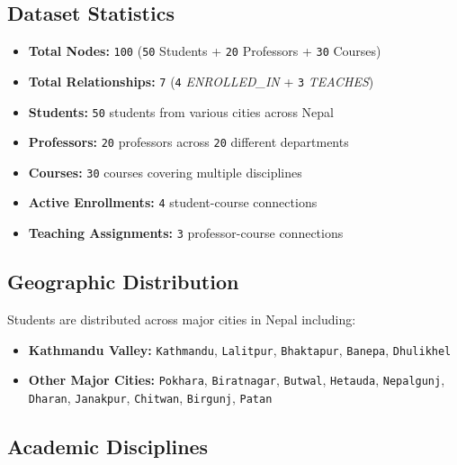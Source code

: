 \subsection{Dataset Statistics}

\begin{itemize}
    \item \textbf{Total Nodes:} \texttt{100} (\texttt{50} Students + \texttt{20} Professors + \texttt{30} Courses)
    \item \textbf{Total Relationships:} \texttt{7} (\texttt{4} \textit{ENROLLED\_IN} + \texttt{3} \textit{TEACHES})
    \item \textbf{Students:} \texttt{50} students from various cities across Nepal
    \item \textbf{Professors:} \texttt{20} professors across \texttt{20} different departments
    \item \textbf{Courses:} \texttt{30} courses covering multiple disciplines
    \item \textbf{Active Enrollments:} \texttt{4} student-course connections
    \item \textbf{Teaching Assignments:} \texttt{3} professor-course connections
\end{itemize}

\subsection{Geographic Distribution}

Students are distributed across major cities in Nepal including:
\begin{itemize}
    \item \textbf{Kathmandu Valley:} \texttt{Kathmandu}, \texttt{Lalitpur}, \texttt{Bhaktapur}, \texttt{Banepa}, \texttt{Dhulikhel}
    \item \textbf{Other Major Cities:} \texttt{Pokhara}, \texttt{Biratnagar}, \texttt{Butwal}, \texttt{Hetauda}, \texttt{Nepalgunj}, \texttt{Dharan}, \texttt{Janakpur}, \texttt{Chitwan}, \texttt{Birgunj}, \texttt{Patan}
\end{itemize}

\subsection{Academic Disciplines}

